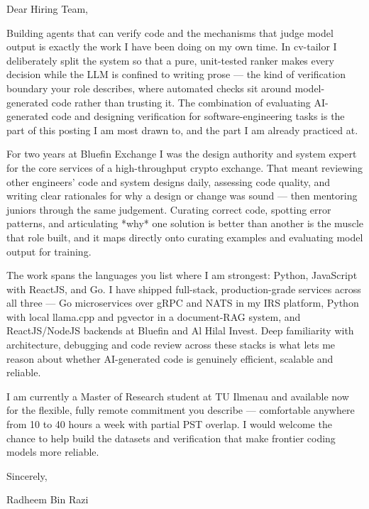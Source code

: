 \documentclass[11pt,a4paper]{coverletter}
\begin{document}

\opening{Dear Hiring Team,}

Building agents that can verify code and the mechanisms that judge model output is exactly the work I have been doing on my own time. In cv-tailor I deliberately split the system so that a pure, unit-tested ranker makes every decision while the LLM is confined to writing prose — the kind of verification boundary your role describes, where automated checks sit around model-generated code rather than trusting it. The combination of evaluating AI-generated code and designing verification for software-engineering tasks is the part of this posting I am most drawn to, and the part I am already practiced at.

For two years at Bluefin Exchange I was the design authority and system expert for the core services of a high-throughput crypto exchange. That meant reviewing other engineers' code and system designs daily, assessing code quality, and writing clear rationales for why a design or change was sound — then mentoring juniors through the same judgement. Curating correct code, spotting error patterns, and articulating *why* one solution is better than another is the muscle that role built, and it maps directly onto curating examples and evaluating model output for training.

The work spans the languages you list where I am strongest: Python, JavaScript with ReactJS, and Go. I have shipped full-stack, production-grade services across all three — Go microservices over gRPC and NATS in my IRS platform, Python with local llama.cpp and pgvector in a document-RAG system, and ReactJS/NodeJS backends at Bluefin and Al Hilal Invest. Deep familiarity with architecture, debugging and code review across these stacks is what lets me reason about whether AI-generated code is genuinely efficient, scalable and reliable.

I am currently a Master of Research student at TU Ilmenau and available now for the flexible, fully remote commitment you describe — comfortable anywhere from 10 to 40 hours a week with partial PST overlap. I would welcome the chance to help build the datasets and verification that make frontier coding models more reliable.

\closing{Sincerely,}{Radheem Bin Razi}

\clearpage
{}

\end{document}
